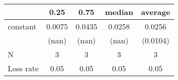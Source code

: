 \begin{tabular}{lcccc}
\hline
          &  0.25  &  0.75  & median & average   \\
\midrule
\midrule
constant  & 0.0075 & 0.0435 & 0.0258 & 0.0256    \\
          & (nan)  & (nan)  & (nan)  & (0.0104)  \\
N         & 3      & 3      & 3      & 3         \\
Loss rate & 0.05   & 0.05   & 0.05   & 0.05      \\
\hline
\end{tabular}